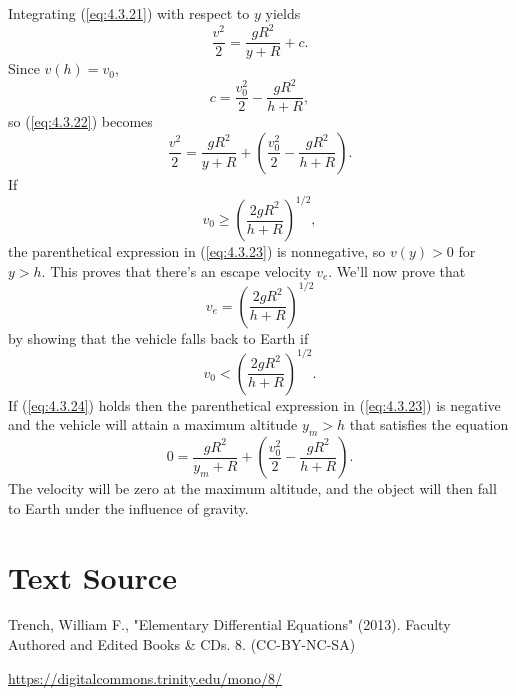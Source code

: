 \documentclass{ximera}
\begin{document}
Integrating (\ref{eq:4.3.21}) with respect to $y$ yields
\begin{equation} \label{eq:4.3.22}
\frac{v^2}{2}=\frac{gR^2}{y+R}+c.
\end{equation}
 Since $v(h)=v_0$,
$$
c=\frac{v_0^2}{2}-\frac{gR^2}{h+R},
$$
 so (\ref{eq:4.3.22}) becomes
\begin{equation} \label{eq:4.3.23}
\frac{v^2}{2}=\frac{gR^2}{y+R}+\left(\frac{v_0^2}{2}-
\frac{gR^2}{h+R}\right).
\end{equation}
If
$$
v_0 \geq\left(\frac{2gR^2}{h+R}\right)^{1/2},
$$
 the parenthetical expression in (\ref{eq:4.3.23})  is nonnegative,
 so $v(y)>0$ for $y>h$. This proves that there's an escape
velocity $v_e$. We'll now prove that
$$
v_e=\left(\frac{2gR^2}{h+R}\right)^{1/2}
$$
by showing that the vehicle falls back to Earth if
\begin{equation} \label{eq:4.3.24}
v_0 <\left(\frac{2gR^2}{h+R}\right)^{1/2}.
\end{equation}
If (\ref{eq:4.3.24})  holds then  the parenthetical expression in
(\ref{eq:4.3.23})
is negative and the vehicle will attain a maximum altitude $y_m>h$
that satisfies the equation
$$
0=\frac{gR^2}{y_m+R}+\left(\frac{v_0^2}{2}-
\frac{gR^2}{h+R}\right).
$$
The velocity will be zero at the maximum  altitude, and the object will
then fall to Earth under the influence of gravity.




 
 
\section*{Text Source}
Trench, William F., "Elementary Differential Equations" (2013). Faculty Authored and Edited Books \& CDs. 8. (CC-BY-NC-SA)
 
\href{https://digitalcommons.trinity.edu/mono/8/}{https://digitalcommons.trinity.edu/mono/8/}
 
 
\end{document}
